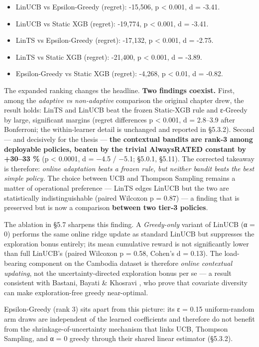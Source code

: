 \begin{itemize}
\tightlist
\item
  LinUCB vs Epsilon-Greedy (regret): -15,506, p \textless{} 0.001, d = -3.41.
\item
  LinUCB vs Static XGB (regret): -19,774, p \textless{} 0.001, d = -3.41.
\item
  LinTS vs Epsilon-Greedy (regret): -17,132, p \textless{} 0.001, d = -2.75.
\item
  LinTS vs Static XGB (regret): -21,400, p \textless{} 0.001, d = -3.89.
\item
  Epsilon-Greedy vs Static XGB (regret): -4,268, p \textless{} 0.01, d = -0.82.
\end{itemize}

The expanded ranking changes the headline. \textbf{Two findings coexist.} First, among the \emph{adaptive vs non-adaptive} comparison the original chapter drew, the result holds: LinTS and LinUCB beat the frozen Static-XGB rule and ε-Greedy by large, significant margins (regret differences p \textless{} 0.001, \textbar d\textbar{} = 2.8--3.9 after Bonferroni; the within-learner detail is unchanged and reported in §5.3.2). Second --- and decisively for the thesis --- \textbf{the contextual bandits are rank-3 among deployable policies, beaten by the trivial AlwaysRATED constant by +30--33 \%} (p \textless{} 0.0001, d = −4.5 / −5.1; §5.0.1, §5.11). The corrected takeaway is therefore: \emph{online adaptation beats a frozen rule, but neither bandit beats the best simple policy.} The choice between UCB and Thompson Sampling remains a matter of operational preference --- LinTS edges LinUCB but the two are statistically indistinguishable (paired Wilcoxon p = 0.87) --- a finding that is preserved but is now a comparison \textbf{between two tier-3 policies}.


The ablation in §5.7 sharpens this finding. A \emph{Greedy-only} variant of LinUCB (α = 0) performs the same online ridge update as standard LinUCB but suppresses the exploration bonus entirely; its mean cumulative reward is not significantly lower than full LinUCB's (paired Wilcoxon p = 0.58, Cohen's d = 0.13). The load-bearing component on the Cambodia dataset is therefore \emph{online contextual updating}, not the uncertainty-directed exploration bonus per se --- a result consistent with Bastani, Bayati \& Khosravi \citeyearpar{Bastani2021}, who prove that covariate diversity can make exploration-free greedy near-optimal.

Epsilon-Greedy (rank 3) sits apart from this picture: its ε = 0.15 uniform-random arm draws are independent of the learned coefficients and therefore do not benefit from the shrinkage-of-uncertainty mechanism that links UCB, Thompson Sampling, and α = 0 greedy through their shared linear estimator (§5.3.2).


